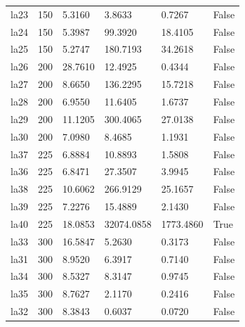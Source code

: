 \begin{table}[htbp]
\begin{tabular}{llllll}
la23 & 150 & 5.3160 & 3.8633 & 0.7267 & False \\
la24 & 150 & 5.3987 & 99.3920 & 18.4105 & False \\
la25 & 150 & 5.2747 & 180.7193 & 34.2618 & False \\
la26 & 200 & 28.7610 & 12.4925 & 0.4344 & False \\
la27 & 200 & 8.6650 & 136.2295 & 15.7218 & False \\
la28 & 200 & 6.9550 & 11.6405 & 1.6737 & False \\
la29 & 200 & 11.1205 & 300.4065 & 27.0138 & False \\
la30 & 200 & 7.0980 & 8.4685 & 1.1931 & False \\
la37 & 225 & 6.8884 & 10.8893 & 1.5808 & False \\
la36 & 225 & 6.8471 & 27.3507 & 3.9945 & False \\
la38 & 225 & 10.6062 & 266.9129 & 25.1657 & False \\
la39 & 225 & 7.2276 & 15.4889 & 2.1430 & False \\
la40 & 225 & 18.0853 & 32074.0858 & 1773.4860 & True \\
la33 & 300 & 16.5847 & 5.2630 & 0.3173 & False \\
la31 & 300 & 8.9520 & 6.3917 & 0.7140 & False \\
la34 & 300 & 8.5327 & 8.3147 & 0.9745 & False \\
la35 & 300 & 8.7627 & 2.1170 & 0.2416 & False \\
la32 & 300 & 8.3843 & 0.6037 & 0.0720 & False \\
\bottomrule
\end{tabular}
\end{table}